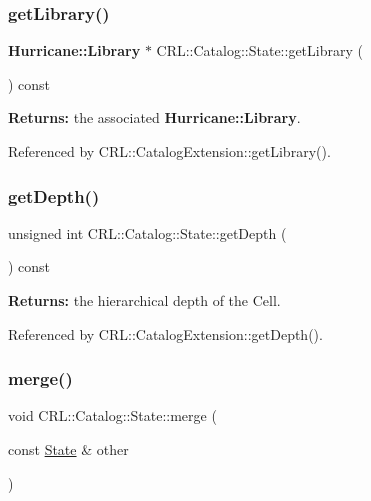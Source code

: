 \subsubsection{\texorpdfstring{get\+Library()}{getLibrary()}}
{\footnotesize\ttfamily \textbf{ Hurricane\+::\+Library} $\ast$ C\+R\+L\+::\+Catalog\+::\+State\+::get\+Library (\begin{DoxyParamCaption}{ }\end{DoxyParamCaption}) const\hspace{0.3cm}{\ttfamily [inline]}}

{\bfseries Returns\+:} the associated \textbf{ Hurricane\+::\+Library}. 

Referenced by C\+R\+L\+::\+Catalog\+Extension\+::get\+Library().

\mbox{\label{classCRL_1_1Catalog_1_1State_a0232ad6dcfda1e2801f788deaad83e08}} 
\subsubsection{\texorpdfstring{get\+Depth()}{getDepth()}}
{\footnotesize\ttfamily unsigned int C\+R\+L\+::\+Catalog\+::\+State\+::get\+Depth (\begin{DoxyParamCaption}{ }\end{DoxyParamCaption}) const\hspace{0.3cm}{\ttfamily [inline]}}

{\bfseries Returns\+:} the hierarchical depth of the Cell. 

Referenced by C\+R\+L\+::\+Catalog\+Extension\+::get\+Depth().

\mbox{\label{classCRL_1_1Catalog_1_1State_a41fde67f1b88de06cae113a0d8108f25}} 
\subsubsection{\texorpdfstring{merge()}{merge()}}
{\footnotesize\ttfamily void C\+R\+L\+::\+Catalog\+::\+State\+::merge (\begin{DoxyParamCaption}\item[{const \mbox{\hyperlink{classCRL_1_1Catalog_1_1State}{State}} \&}]{other }\end{DoxyParamCaption})\hspace{0.3cm}{\ttfamily [inline]}}


